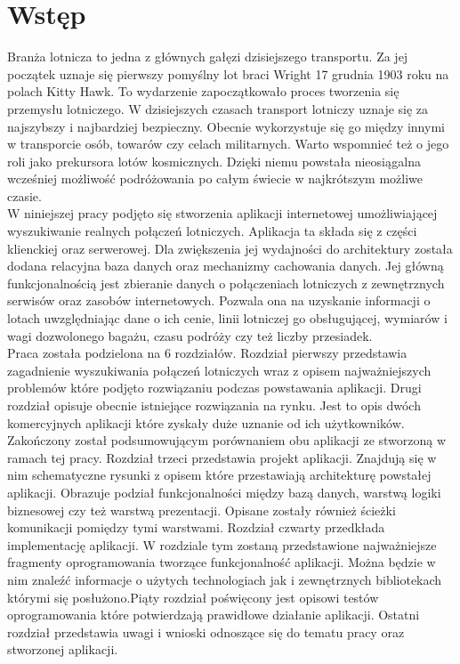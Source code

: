 \documentclass[12pt, twoside]{report}
\begin{document}
\chapter*{Wstęp}
Branża lotnicza to jedna z głównych gałęzi dzisiejszego transportu. Za jej początek uznaje się pierwszy pomyślny lot braci Wright 17 grudnia 1903 roku na polach Kitty Hawk. To wydarzenie zapoczątkowało proces tworzenia się przemysłu lotniczego. W dzisiejszych czasach transport lotniczy uznaje się za najszybszy i najbardziej bezpieczny. Obecnie wykorzystuje się go między innymi w transporcie osób, towarów czy celach militarnych. Warto wspomnieć też o jego roli jako prekursora lotów kosmicznych. Dzięki niemu powstała nieosiągalna wcześniej możliwość podróżowania po całym świecie w najkrótszym możliwe czasie.\\
\indent W niniejszej pracy podjęto się stworzenia aplikacji internetowej umożliwiającej wyszukiwanie realnych połączeń lotniczych. Aplikacja ta składa się z części klienckiej oraz serwerowej. Dla zwiększenia jej wydajności do architektury została dodana relacyjna baza danych oraz mechanizmy cachowania danych.
Jej główną funkcjonalnością jest zbieranie danych o połączeniach lotniczych z zewnętrznych serwisów oraz zasobów internetowych. 
 Pozwala ona na uzyskanie informacji o lotach uwzględniając dane o ich cenie, linii lotniczej go obsługującej, wymiarów i wagi dozwolonego bagażu, czasu podróży czy też liczby przesiadek.\\
\indent
Praca została podzielona na 6 rozdziałów. Rozdział pierwszy przedstawia zagadnienie wyszukiwania połączeń lotniczych wraz z opisem najważniejszych problemów które podjęto rozwiązaniu podczas powstawania aplikacji. Drugi rozdział opisuje obecnie istniejące rozwiązania na rynku. Jest to opis dwóch komercyjnych aplikacji które zyskały duże uznanie od ich użytkowników. Zakończony został podsumowującym porównaniem obu aplikacji ze stworzoną w ramach tej pracy. Rozdział trzeci przedstawia projekt aplikacji. Znajdują się w nim schematyczne rysunki z opisem które przestawiają architekturę powstałej aplikacji. Obrazuje podział funkcjonalności między bazą danych, warstwą logiki biznesowej czy też warstwą prezentacji. Opisane zostały również ścieżki komunikacji pomiędzy tymi warstwami.
Rozdział czwarty przedkłada implementację aplikacji. W rozdziale tym zostaną przedstawione najważniejsze fragmenty oprogramowania tworzące funkcjonalność aplikacji. Można będzie w nim znaleźć informacje o użytych technologiach jak i zewnętrznych bibliotekach którymi się posłużono.Piąty rozdział poświęcony jest opisowi testów oprogramowania które potwierdzają prawidłowe działanie aplikacji. Ostatni rozdział przedstawia uwagi i wnioski odnoszące się do tematu pracy oraz stworzonej aplikacji.
\end{document}
